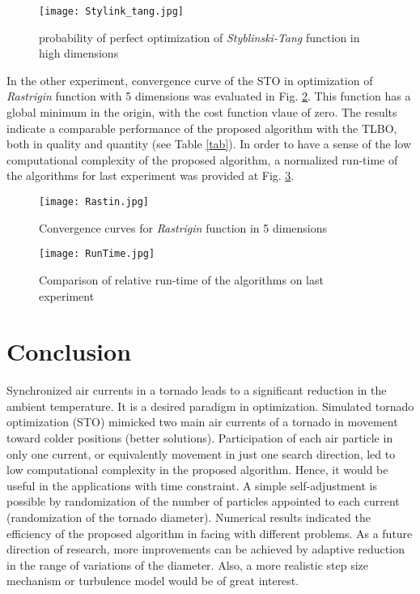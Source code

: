 \documentclass[conference]{IEEEtran}
\begin{document}
\begin{figure}[h!]
 \centering
  \texttt{[image: Stylink\_tang.jpg]}
  \caption{probability of perfect optimization of \emph{Styblinski-Tang} function in high dimensions}
  \label{highD}
\end{figure}


In the other experiment, convergence curve of the STO in optimization of \emph{Rastrigin} function with 5 dimensions was evaluated in Fig. \ref{rast}. This function has a global minimum in the origin, with the cost function vlaue of zero. The results indicate a comparable performance of the proposed algorithm with the TLBO, both in quality and quantity (see Table \ref{tab}). In order to have a sense of the low computational complexity of the proposed algorithm, a normalized run-time of the algorithms for last experiment was provided at Fig. \ref{run}.


\begin{figure}[h!]
 \centering
  \texttt{[image: Rastin.jpg]}
  \caption{Convergence curves for \emph{Rastrigin} function in 5 dimensions}
  \label{rast}
\end{figure}

\begin{figure}[h!]
 \centering
  \texttt{[image: RunTime.jpg]}
  \caption{Comparison of relative run-time of the algorithms on last experiment}
  \label{run}
\end{figure}



\section{Conclusion}

Synchronized air currents in a tornado leads to a significant reduction in the ambient temperature. It is a desired paradigm in optimization. Simulated tornado optimization (STO) mimicked two main air currents of a tornado in movement toward colder positions (better solutions). Participation of each air particle in only one current, or equivalently movement in just one search direction, led to low computational complexity in the proposed algorithm. Hence, it would be useful in the applications with time constraint. A simple self-adjustment is possible by randomization of the number of particles appointed to each current (randomization of the tornado diameter). Numerical results indicated the efficiency of the proposed algorithm in facing with different problems. As a future direction of research, more improvements can be achieved by adaptive reduction in the range of variations of the diameter. Also, a more realistic step size mechanism or turbulence model would be of great interest.\\
\end{document}
